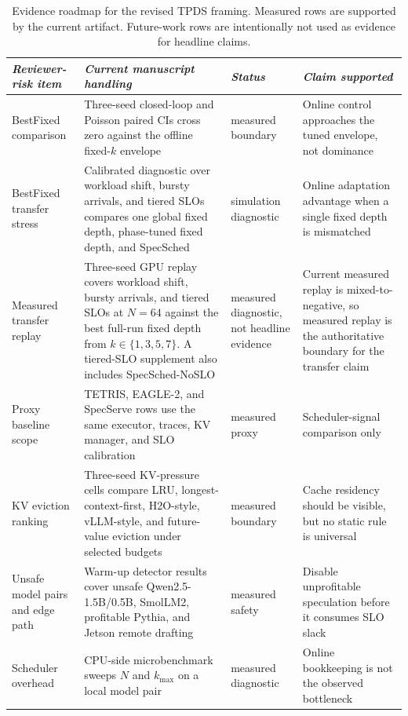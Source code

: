\documentclass[10pt,journal,onecolumn]{IEEEtran}
\newcommand{\system}{SpecSched}
\begin{document}
\begin{table}[t]
\centering
\caption{Evidence roadmap for the revised TPDS framing. Measured rows
are supported by the current artifact. Future-work rows are intentionally
not used as evidence for headline claims.}
\label{tab:evidence-roadmap}
\scriptsize
\setlength{\tabcolsep}{3.0pt}
\renewcommand{\arraystretch}{1.12}
\begin{tabular}{@{}p{}p{}p{}p{}@{}}
\toprule
\textit{Reviewer-risk item} & \textit{Current manuscript handling} &
\textit{Status} & \textit{Claim supported} \\
\midrule
BestFixed comparison & Three-seed closed-loop and Poisson paired CIs
cross zero against the offline fixed-$k$ envelope & measured boundary &
Online control approaches the tuned envelope, not dominance \\
BestFixed transfer stress & Calibrated diagnostic over workload shift,
bursty arrivals, and tiered SLOs compares one global fixed depth,
phase-tuned fixed depth, and \system{} & simulation diagnostic &
Online adaptation advantage when a single fixed depth is mismatched \\
Measured transfer replay & Three-seed GPU replay covers workload shift,
bursty arrivals, and tiered SLOs at $N=64$ against the best full-run
fixed depth from $k\in\{1,3,5,7\}$. A tiered-SLO supplement also
includes \system{}-NoSLO & measured diagnostic, not headline evidence &
Current measured replay is mixed-to-negative, so measured replay is the
authoritative boundary for the transfer claim \\
Proxy baseline scope & TETRIS, EAGLE-2, and SpecServe rows use the same
executor, traces, KV manager, and SLO calibration & measured proxy &
Scheduler-signal comparison only \\
KV eviction ranking & Three-seed KV-pressure cells compare LRU,
longest-context-first, H2O-style, vLLM-style, and future-value eviction
under selected budgets & measured boundary & Cache residency should be
visible, but no static rule is universal \\
Unsafe model pairs and edge path & Warm-up detector results cover unsafe
Qwen2.5-1.5B/0.5B, SmolLM2, profitable Pythia, and Jetson remote drafting
& measured safety & Disable unprofitable speculation before it consumes
SLO slack \\
Scheduler overhead & CPU-side microbenchmark sweeps $N$ and $k_{\max}$
on a local model pair & measured diagnostic & Online bookkeeping is not
the observed bottleneck \\

\end{tabular}
\end{table}
\end{document}
